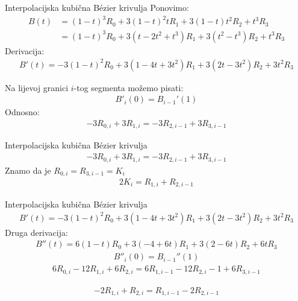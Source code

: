 \documentclass[9pt]{beamer}
\begin{document}
\begin{frame}{Interpolacijska kubična B\'{e}zier krivulja}
	Ponovimo:
	\begin{align*}
	B(t) &= (1-t)^3R_0 + 3(1-t)^2tR_1 + 3(1-t)t^2R_2 + t^3R_3 \\ 
	&=(1-t)^3R_0 + 3(t-2t^2 +t^3)R_1 + 3(t^2-t^3)R_2 + t^3R_3 
	\end{align*}
	Derivacija:
	\begin{align*}
	B'(t) = -3(1-t)^2R_0 + 3(1-4t +3t^2)R_1 + 3(2t-3t^2)R_2 + 3t^2R_3
	\end{align*}
	
	Na lijevoj granici $i$-tog segmenta možemo pisati:
	\begin{align*}
	B'_i(0) = B_{i-1}'(1)
	\end{align*}
	Odnosno:
	\begin{align*}
	-3R_{0, i} + 3R_{1, i} = -3R_{2, i-1} + 3R_{3, i-1}
	\end{align*}
\end{frame}

\begin{frame}{Interpolacijska kubična B\'{e}zier krivulja}
	\begin{align*}
	-3R_{0, i} + 3R_{1, i} = -3R_{2, i-1} + 3R_{3, i-1}
	\end{align*}
	Znamo da je $R_{0, i} = R_{3, i-1} = K_{i}$
	\begin{align*}
	2K_i = R_{1, i}  + R_{2, i-1} 
	\end{align*}
	
	
\end{frame}

\begin{frame}{Interpolacijska kubična B\'{e}zier krivulja}
	\begin{align*}
	B'(t) = -3(1-t)^2R_0 + 3(1-4t +3t^2)R_1 + 3(2t-3t^2)R_2 + 3t^2R_3
	\end{align*}
	Druga derivacija:
	\begin{align*}
	B''(t) =6(1-t)R_0+3(-4+6t)R_1+3(2-6t)R_2+6tR_3
	\end{align*}
	\begin{align*}
	B''_i(0) = B_{i-1}''(1)
	\end{align*}
	\begin{align*}
	6R_{0,i}-12R_{1,i}+6R_{2,i}=6R_{1,i-1}-12R_{2,i}-1+6R_{3,i-1}
	\end{align*}
	
	\begin{align*}
	-2R_{1,i} + R_{2, i} = R_{1, i-1} - 2R_{2, i-1}
	\end{align*}
\end{frame}		
\end{document}
